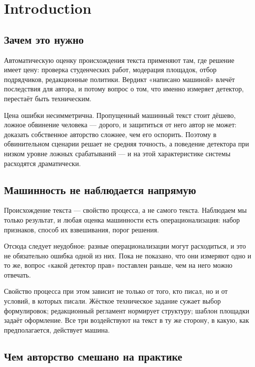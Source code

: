 \documentclass[11pt,a4paper]{article}
\renewcommand{\_}{\textunderscore\allowbreak}
\begin{document}
\section{Introduction}

\subsection{Зачем это нужно}

Автоматическую оценку происхождения текста применяют там, где решение имеет цену:
проверка студенческих работ, модерация площадок, отбор подрядчиков, редакционные
политики. Вердикт «написано машиной» влечёт последствия для автора, и потому
вопрос о том, что именно измеряет детектор, перестаёт быть техническим.

Цена ошибки несимметрична. Пропущенный машинный текст стоит дёшево, ложное
обвинение человека — дорого, и защититься от него автор не может: доказать
собственное авторство сложнее, чем его оспорить. Поэтому в обвинительном сценарии
решает не средняя точность, а поведение детектора при низком уровне ложных
срабатываний — и на этой характеристике системы расходятся драматически.

\subsection{Машинность не наблюдается напрямую}

Происхождение текста — свойство процесса, а не самого текста. Наблюдаем мы только
результат, и любая оценка машинности есть операционализация: набор признаков,
способ их взвешивания, порог решения.

Отсюда следует неудобное: разные операционализации могут расходиться, и это не
обязательно ошибка одной из них. Пока не показано, что они измеряют одно и то же,
вопрос «какой детектор прав» поставлен раньше, чем на него можно отвечать.

Свойство процесса при этом зависит не только от того, кто писал, но и от условий,
в которых писали. Жёсткое техническое задание сужает выбор формулировок; редакционный
регламент нормирует структуру; шаблон площадки задаёт оформление. Все три
воздействуют на текст в ту же сторону, в какую, как предполагается, действует
машина.

\subsection{Чем авторство смешано на практике}
\end{document}
